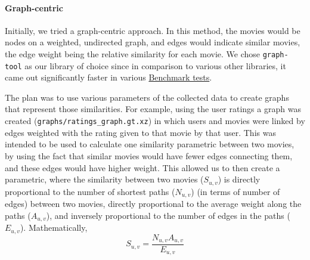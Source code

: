 \documentclass[11pt]{article}
\begin{document}
\hypertarget{graph-centric}{%
\paragraph{Graph-centric}\label{graph-centric}}

Initially, we tried a graph-centric approach. In this method, the movies
would be nodes on a weighted, undirected graph, and edges would indicate
similar movies, the edge weight being the relative similarity for each
movie. We chose \texttt{graph-tool} as our library of choice since in
comparison to various other libraries, it came out significantly faster
in various
\href{https://www.timlrx.com/2020/05/10/benchmark-of-popular-graph-network-packages-v2/}{Benchmark
tests}.

The plan was to use various parameters of the collected data to create
graphs that represent those similarities. For example, using the user
ratings a graph was created (\texttt{graphs/ratings\_graph.gt.xz}) in
which users and movies were linked by edges weighted with the rating
given to that movie by that user. This was intended to be used to
calculate one similarity parametric between two movies, by using the
fact that similar movies would have fewer edges connecting them, and
these edges would have higher weight. This allowed us to then create a
parametric, where the similarity between two movies (\(S_{u, v}\)) is
directly proportional to the number of shortest paths (\(N_{u, v}\)) (in
terms of number of edges) between two movies, directly proportional to
the average weight along the paths (\(A_{u, v}\)), and inversely
proportional to the number of edges in the paths (\(E_{u, v}\)).
Mathematically, \[S_{u,v} = \frac{N_{u, v}A_{u, v}}{E_{u, v}}\]
\end{document}
